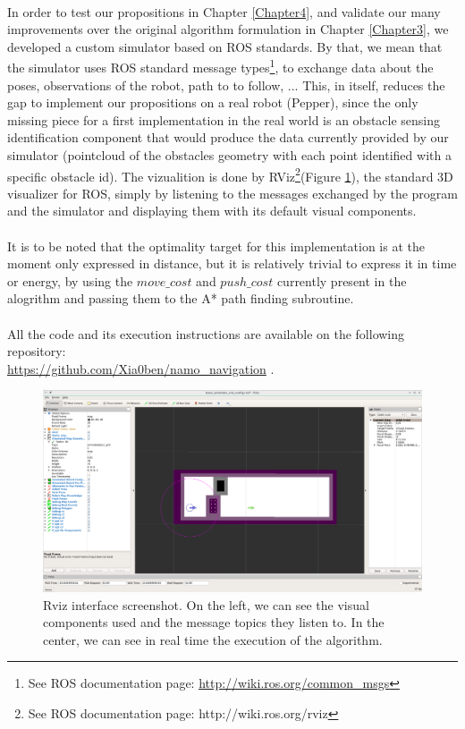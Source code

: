 \paragraph{} In order to test our propositions in Chapter \ref{Chapter4}, and validate our many improvements over the original algorithm formulation in Chapter \ref{Chapter3}, we developed a custom simulator based on ROS standards. By that, we mean that the simulator uses ROS standard message types\footnote{See ROS documentation page: \url{http://wiki.ros.org/common_msgs}}, to exchange data about the poses, observations of the robot, path to to follow, ... This, in itself, reduces the gap to implement our propositions on a real robot (Pepper), since the only missing piece for a first implementation in the real world is an obstacle sensing identification component that would produce the data currently provided by our simulator (pointcloud of the obstacles geometry with each point identified with a specific obstacle id). The vizualition is done by RViz\footnote{See ROS documentation page: http://wiki.ros.org/rviz}(Figure \ref{fig:rviz}), the standard 3D visualizer for ROS, simply by listening to the messages exchanged by the program and the simulator and displaying them with its default visual components.

\paragraph{} It is to be noted that the optimality target for this implementation is at the moment only expressed in distance, but it is relatively trivial to express it in time or energy, by using the $move\_cost$ and $push\_cost$ currently present in the alogrithm and passing them to the A* path finding subroutine.

\paragraph{} All the code and its execution instructions are available on the following repository: \\ \url{https://github.com/Xia0ben/namo_navigation} .

\begin{figure}[H]
\centering
\includegraphics[width=14cm]{Figures/Simulation/rviz.png}
\caption{Rviz interface screenshot. On the left, we can see the visual components used and the message topics they listen to. In the center, we can see in real time the execution of the algorithm.}
\label{fig:rviz}
\end{figure}

